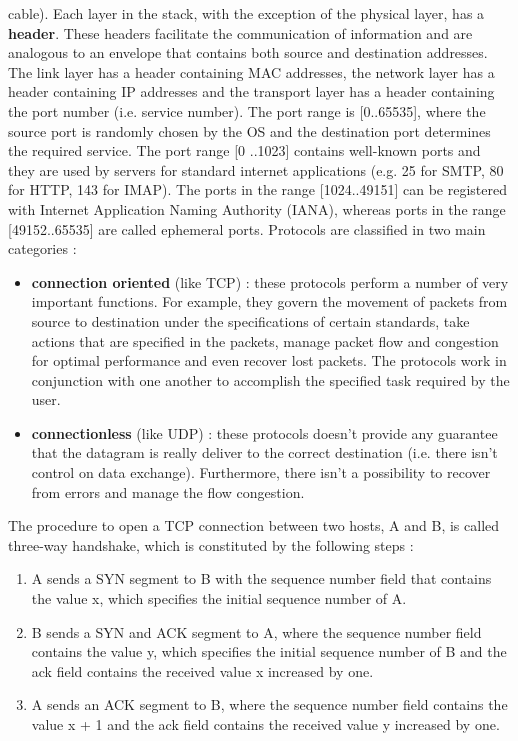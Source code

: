 \documentclass[11pt]{article}
\begin{document}
cable). Each layer in the stack, with the exception of the physical layer, has a \textbf{header}. These headers facilitate the communication of information and are analogous to an envelope that contains both source and destination addresses. The link layer has a header containing MAC addresses, the network layer has a header containing IP addresses and the transport layer has a header containing the port  number (i.e. service number). The port range is [0..65535], where the source port is randomly chosen by the OS and the destination port determines the required service. The port range [0 ..1023] contains well-known ports and they are used by servers for standard internet applications (e.g. 25 for SMTP, 80 for HTTP, 143 for IMAP). The ports in the range [1024..49151] can be registered with Internet Application Naming Authority (IANA), whereas ports in the range [49152..65535] are called ephemeral ports. Protocols are classified in two main categories :
\begin{itemize}
\item \textbf{connection oriented} (like TCP) : these protocols perform a number of very important functions. For example, they govern the movement of packets from source to destination under the specifications of certain standards, take actions that are specified in the packets, manage packet flow and congestion for optimal performance and even recover lost packets. The protocols work in conjunction with one another to accomplish the specified task required by the user.
\item \textbf{connectionless} (like UDP) : these protocols doesn't provide any guarantee that the datagram is really deliver to the correct destination (i.e. there isn't control on data exchange). Furthermore, there isn't a possibility to recover from errors and manage the flow congestion.
\end{itemize}
The procedure to open a TCP connection between two hosts, A and B, is called three-way handshake, which is constituted by the following steps :
\begin{enumerate}
\item A sends a SYN segment to B with the sequence number field that contains the value x, which specifies the initial sequence number of A.
\item B sends a SYN and ACK segment to A, where the sequence number field contains the value y, which specifies the initial sequence number of B and the ack field contains the received value x increased by one.
\item A sends an ACK segment to B, where the sequence number field contains the value x + 1 and the ack field contains the received value y increased by one.
\end{enumerate}
\end{document}
